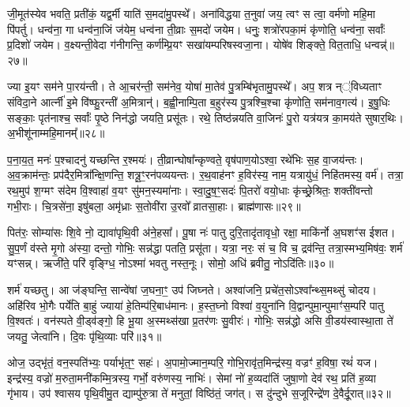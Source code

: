 {\anuvakamend[{अ॒गा॒ꣳ स॒ह॒स्रा॒क्ष॒ दे॒वाः॒ स॒हस्र॑धारा॒मत्यꣳ॑हा॒ अनु॑वर्त्मानः॒ षोड॑श च॥५॥}]}

जी॒मूत॑स्येव भवति॒ प्रती॑कं॒ यद्व॒र्मी याति॑ स॒मदा॑मु॒पस्थे᳚। अना॑विद्धया त॒नुवा॑ जय॒ त्वꣳ स त्वा॒ वर्म॑णो महि॒मा पि॑पर्तु। धन्व॑ना॒ गा धन्व॑ना॒जिं ज॑येम॒ धन्व॑ना ती॒व्राः स॒मदो॑ जयेम। धनुः॒ शत्रो॑रपका॒मं कृ॑णोति॒ धन्व॑ना॒ सर्वाः᳚ प्र॒दिशो॑ जयेम। व॒क्ष्यन्ती॒वेदा ग॑नीगन्ति॒ कर्ण॑म्प्रि॒यꣳ सखा॑यम्परिषस्वजा॒ना। योषे॑व शिङ्क्ते॒ वित॒ताधि॒ धन्वन्न्॑॥२७॥

ज्या इ॒यꣳ सम॑ने पा॒रय॑न्ती। ते आ॒चर॑न्ती॒ सम॑नेव॒ योषा॑ मा॒तेव॑ पु॒त्रम्बि॑भृतामु॒पस्थे᳚। अप॒ शत्र न््॑विध्यताꣳ संविदा॒ने आर्त्नी॑ इ॒मे वि॑ष्फु॒रन्ती॑ अ॒मित्रान्॑। ब॒ह्वी॒नाम्पि॒ता ब॒हुर॑स्य पु॒त्रश्चि॒श्चा कृ॑णोति॒ सम॑नाव॒गत्य॑। इ॒षु॒धिः सङ्काः॒ पृत॑नाश्च॒ सर्वाः᳚ पृ॒ष्ठे निन॑द्धो जयति॒ प्रसू॑तः। रथे॒ तिष्ठ॑न्नयति वा॒जिनः॑ पु॒रो यत्र॑यत्र का॒मय॑ते सुषार॒थिः। अ॒भीशू॑नाम्महि॒मानम्᳚॥२८॥

प॒ना॒य॒त॒ मनः॑ प॒श्चादनु॑ यच्छन्ति र॒श्मयः॑। ती॒व्रान्घोषा᳚न्कृण्वते॒ वृष॑पाण॒यो\-ऽश्वा॒ रथे॑भिः स॒ह वा॒जय॑न्तः। अ॒व॒क्राम॑न्तः॒ प्रप॑दैर॒मित्रा᳚न्क्षि॒णन्ति॒ शत्रू॒ꣳ॒रन॑पव्ययन्तः। र॒थ॒वाह॑नꣳ ह॒विर॑स्य॒ नाम॒ यत्रायु॑धं॒ निहि॑तमस्य॒ वर्म॑। तत्रा॒ रथ॒मुप॑ श॒ग्मꣳ स॑देम वि॒श्वाहा॑ व॒यꣳ सु॑मन॒स्यमा॑नाः। स्वा॒दु॒ष॒ꣳ॒सदः॑ पि॒तरो॑ वयो॒धाः कृ॑च्छ्रे॒श्रितः॒ शक्ती॑वन्तो गभी॒राः। चि॒त्रसे॑ना॒ इषु॑बला॒ अमृ॑ध्राः स॒तोवी॑रा उ॒रवो᳚ व्रातसा॒हाः। ब्राह्म॑णासः॥२९॥

पित॑रः॒ सोम्या॑सः शि॒वे नो॒ द्यावा॑पृथि॒वी अ॑ने॒हसा᳚। पू॒षा नः॑ पातु दुरि॒तादृ॑तावृधो॒ रक्षा॒ माकि॑र्नो अ॒घशꣳ॑स ईशत। सु॒प॒र्णं व॑स्ते मृ॒गो अ॑स्या॒ दन्तो॒ गोभिः॒ सन्न॑द्धा पतति॒ प्रसू॑ता। यत्रा॒ नरः॒ सं च॒ वि च॒ द्रव॑न्ति॒ तत्रा॒स्मभ्य॒मिष॑वः॒ शर्म॑ यꣳसन्न्। ऋजी॑ते॒ परि॑ वृङ्ग्धि॒ नो\-ऽश्मा॑ भवतु नस्त॒नूः। सोमो॒ अधि॑ ब्रवीतु॒ नो\-ऽदि॑तिः॥३०॥

शर्म॑ यच्छतु। आ ज॑ङ्घन्ति॒ सान्वे॑षां ज॒घना॒ꣳ॒ उप॑ जिघ्नते। अश्वा॑जनि॒ प्रचे॑त॒सो\-ऽश्वा᳚न्थ्स॒मथ्सु॑ चोदय। अहि॑रिव भो॒गैः पर्ये॑ति बा॒हुं ज्याया॑ हे॒तिम्प॑रि॒बाध॑मानः। ह॒स्त॒घ्नो विश्वा॑ व॒युना॑नि वि॒द्वान्पुमा॒न्पुमाꣳ॑स॒म्परि॑ पातु वि॒श्वतः॑। वन॑स्पते वी॒ड्व॑ङ्गो॒ हि भू॒या अ॒स्मथ्स॑खा प्र॒तर॑णः सु॒वीरः॑। गोभिः॒ सन्न॑द्धो असि वी॒डय॑स्वास्था॒ता ते॑ जयतु॒ जेत्वा॑नि। दि॒वः पृ॑थि॒व्याः परि॑॥३१॥

ओज॒ उद्भृ॑तं॒ वन॒स्पति॑भ्यः॒ पर्याभृ॑त॒ꣳ॒ सहः॑। अ॒पामो॒ज्मान॒म्परि॒ गोभि॒रावृ॑त॒मिन्द्र॑स्य॒ वज्रꣳ॑ ह॒विषा॒ रथं॑ यज। इन्द्र॑स्य॒ वज्रो॑ म॒रुता॒मनी॑कम्मि॒त्रस्य॒ गर्भो॒ वरु॑णस्य॒ नाभिः॑। सेमां नो॑ ह॒व्यदा॑तिं जुषा॒णो देव॑ रथ॒ प्रति॑ ह॒व्या गृ॑भाय। उप॑ श्वासय पृथि॒वीमु॒त द्याम्पु॑रु॒त्रा ते॑ मनुतां॒ विष्ठि॑तं॒ जग॑त्। स दु॑न्दुभे स॒जूरिन्द्रे॑ण दे॒वैर्दू॒रात्॥३२॥

